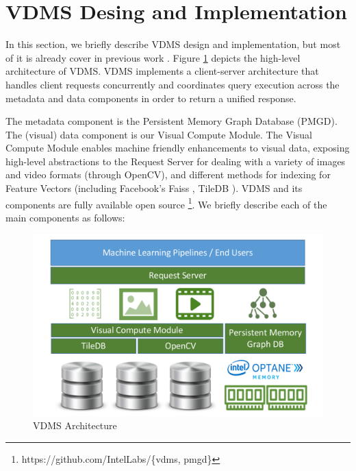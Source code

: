 \section{VDMS Desing and Implementation}
\label{arch}

In this section, we briefly describe VDMS design and implementation,
but most of it is already cover in previous work \cite{vdms-nips}.
Figure \ref{fig:arch} depicts the high-level architecture of VDMS.
VDMS implements a client-server architecture that handles client
requests concurrently and coordinates query execution across
the metadata and data components in order to return a unified response.

The metadata component is the Persistent Memory Graph
Database (PMGD). The (visual) data component is our Visual Compute Module.
The Visual Compute Module enables machine friendly enhancements to
visual data, exposing high-level abstractions to the Request Server for
dealing with a variety of images and video formats (through OpenCV),
and different methods for indexing for Feature Vectors
(including Facebook's Faiss \cite{faiss}, TileDB \cite{TileDB}).
VDMS and its components are fully available open source
\footnote{https://github.com/IntelLabs/\{vdms, pmgd\}}.
We briefly describe each of the main components as follows:

\begin{figure}[]
\centering
\includegraphics[width=1\columnwidth]{figures/vdms_arch.pdf}
\caption{VDMS Architecture}
\label{fig:arch}
\end{figure}


